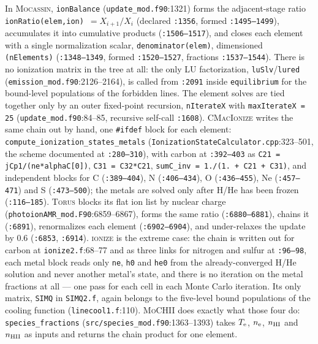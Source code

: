 \documentclass[english,a4paper]{my_memo}
\newcommand{\code}[1]{\texttt{#1}}
\newcommand{\MoCHII}{\textsc{MoCHII}}
\newcommand{\Wood}{\textsc{ionize}}
\newcommand{\CMI}{\textsc{CMacIonize}}
\newcommand{\Torus}{\textsc{Torus}}
\newcommand{\Mocassin}{\textsc{Mocassin}}
\newcommand{\Te}{T_{\rm e}}
\newcommand{\nelec}{n_{\rm e}}
\begin{document}
In \Mocassin{}, \code{ionBalance} (\code{update\_\allowbreak mod.f90}:1321) forms the
adjacent-stage ratio \code{ionRatio(elem,ion)}~$=X_{i+1}/X_i$ (declared
\code{:1356}, formed \code{:1495--1499}), accumulates it into cumulative
products (\code{:1506--1517}), and closes each element with a single
normalization scalar, \code{denominator(elem)}, dimensioned
\code{(nElements)} (\code{:1348--1349}, formed \code{:1520--1527}, fractions
\code{:1537--1544}).  There is no ionization matrix in the tree at all: the
only LU factorization, \code{luSlv}/\code{lured}
(\code{emission\_\allowbreak mod.f90}:2126--2164), is called from \code{:2091} inside
\code{equilibrium} for the bound-level populations of the forbidden lines.
The element solves are tied together only by an outer fixed-point recursion,
\code{nIterateX} with \code{maxIterateX = 25} (\code{update\_\allowbreak mod.f90}:84--85,
recursive self-call \code{:1608}).  \CMI{} writes the same chain out by hand,
one \code{\#ifdef} block for each element:
\code{compute\_\allowbreak ionization\_\allowbreak states\_\allowbreak metals}
(\code{Ionization\allowbreak State\allowbreak Calculator.cpp}:323--501, the scheme documented at
\code{:280--310}), with carbon at \code{:392--403} as
\code{C21 = jCp1/(ne*alphaC[0])}, \code{C31 = C32*C21},
\code{sumC\_inv = 1./(1.\,+\,C21\,+\,C31)}, and independent blocks for C
(\code{:389--404}), N (\code{:406--434}), O (\code{:436--455}), Ne
(\code{:457--471}) and S (\code{:473--500}); the metals are solved only after
H/He has been frozen (\code{:116--185}).  \Torus{} blocks its flat ion list
by nuclear charge (\code{photoion\allowbreak AMR\_\allowbreak mod.F90}:6859--6867), forms the same
ratio (\code{:6880--6881}), chains it (\code{:6891}), renormalizes each
element (\code{:6902--6904}), and under-relaxes the update by 0.6
(\code{:6853}, \code{:6914}).  \Wood{} is the extreme case: the chain is
written out for carbon at \code{ionize2.f}:68--77 and as three links for
nitrogen and sulfur at \code{:96--98}, each metal block reads only \code{ne},
\code{h0} and \code{he0} from the already-converged H/He solution and never
another metal's state, and there is no iteration on the metal fractions at
all --- one pass for each cell in each Monte Carlo iteration.  Its only
matrix, \code{SIMQ} in \code{SIMQ2.f}, again belongs to the five-level bound
populations of the cooling function (\code{linecool1.f}:110).  \MoCHII{} does
exactly what those four do: \code{species\_fractions}
(\code{src/species\_\allowbreak mod.f90}:1363--1393) takes $\Te$, $\nelec$, $n_{\rm HI}$
and $n_{\rm HII}$ as inputs and returns the chain product for one element.
\end{document}
